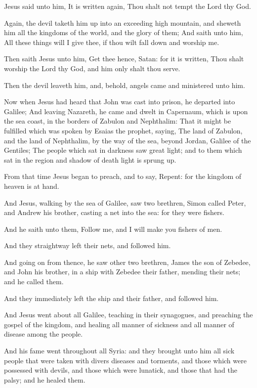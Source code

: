 \Verse Jesus said unto him, It is written again, Thou shalt not tempt the Lord thy God.

\Verse Again, the devil taketh him up into an exceeding high mountain, and sheweth him all the kingdoms of the world, and the glory of them; \Verse And saith unto him, All these things will I give thee, if thou wilt fall down and worship me.

\Verse Then saith Jesus unto him, Get thee hence, Satan: for it is written, Thou shalt worship the Lord thy God, and him only shalt thou serve.

\Verse Then the devil leaveth him, and, behold, angels came and ministered unto him.

\Verse Now when Jesus had heard that John was cast into prison, he departed into Galilee; \Verse And leaving Nazareth, he came and dwelt in Capernaum, which is upon the sea coast, in the borders of Zabulon and Nephthalim: \Verse That it might be fulfilled which was spoken by Esaias the prophet, saying, \Verse The land of Zabulon, and the land of Nephthalim, by the way of the sea, beyond Jordan, Galilee of the Gentiles; \Verse The people which sat in darkness saw great light; and to them which sat in the region and shadow of death light is sprung up.

\Verse From that time Jesus began to preach, and to say, Repent: for the kingdom of heaven is at hand.

\Verse And Jesus, walking by the sea of Galilee, saw two brethren, Simon called Peter, and Andrew his brother, casting a net into the sea: for they were fishers.

\Verse And he saith unto them, Follow me, and I will make you fishers of men.

\Verse And they straightway left their nets, and followed him.

\Verse And going on from thence, he saw other two brethren, James the son of Zebedee, and John his brother, in a ship with Zebedee their father, mending their nets; and he called them.

\Verse And they immediately left the ship and their father, and followed him.

\Verse And Jesus went about all Galilee, teaching in their synagogues, and preaching the gospel of the kingdom, and healing all manner of sickness and all manner of disease among the people.

\Verse And his fame went throughout all Syria: and they brought unto him all sick people that were taken with divers diseases and torments, and those which were possessed with devils, and those which were lunatick, and those that had the palsy; and he healed them.

